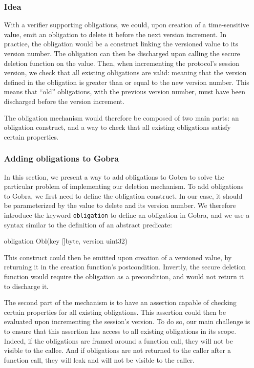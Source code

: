 \subsubsection{Idea}
\label{sec:obligations-idea}

With a verifier supporting obligations, we could, upon creation of a time-sensitive value, emit an obligation to delete it before the next version increment. 
In practice, the obligation would be a construct linking the versioned value to its version number.
The obligation can then be discharged upon calling the secure deletion function on the value.
Then, when incrementing the protocol's session version, we check that all existing obligations are valid: meaning that the version defined in the obligation is greater than or equal to the new version number.
This means that “old” obligations, with the previous version number, must have been discharged before the version increment.

The obligation mechanism would therefore be composed of two main parts: an obligation construct, and a way to check that all existing obligations satisfy certain properties.

\subsubsection{Adding obligations to Gobra}
\label{sec:adding-obligations-to-gobra}

In this section, we present a way to add obligations to Gobra to solve the particular problem of implementing our deletion mechanism.
To add obligations to Gobra, we first need to define the obligation construct.
In our case, it should be parameterized by the value to delete and its version number.
We therefore introduce the keyword \texttt{obligation} to define an obligation in Gobra, and we use a syntax similar to the definition of an abstract predicate:
\begin{gobra}
obligation Obl(key []byte, version uint32)
\end{gobra}
This construct could then be emitted upon creation of a versioned value, by returning it in the creation function's postcondition.
Invertly, the secure deletion function would require the obligation as a precondition, and would not return it to discharge it.

The second part of the mechanism is to have an assertion capable of checking certain properties for all existing obligations. This assertion could then be evaluated upon incrementing the session's version.
To do so, our main challenge is to ensure that this assertion has access to all existing obligations in its scope.
Indeed, if the obligations are framed around a function call, they will not be visible to the callee.
And if obligations are not returned to the caller after a function call, they will leak and will not be visible to the caller.

